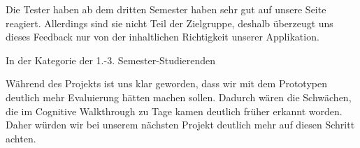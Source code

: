 Die Tester haben ab dem dritten Semester haben sehr gut auf unsere Seite reagiert. Allerdings sind sie nicht Teil der Zielgruppe, deshalb überzeugt uns dieses Feedback nur von der inhaltlichen Richtigkeit unserer Applikation.

In der Kategorie der 1.-3. Semester-Studierenden %

Während des Projekts ist uns klar geworden, dass wir mit dem Prototypen deutlich mehr Evaluierung hätten machen sollen. 
Dadurch wären die Schwächen, die im Cognitive Walkthrough zu Tage kamen deutlich früher erkannt worden.
Daher würden wir bei unserem nächsten Projekt deutlich mehr auf diesen Schritt achten.


